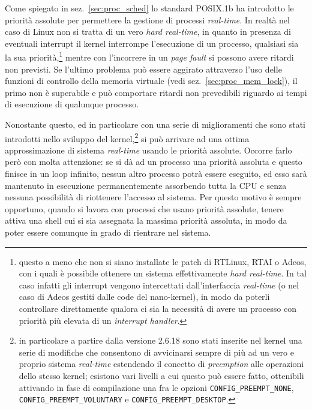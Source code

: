 Come spiegato in sez.~\ref{sec:proc_sched} lo standard POSIX.1b ha introdotto
le priorità assolute per permettere la gestione di processi
\textit{real-time}. In realtà nel caso di Linux non si tratta di un vero
\textit{hard real-time}, in quanto in presenza di eventuali interrupt il
kernel interrompe l'esecuzione di un processo, qualsiasi sia la sua
priorità,\footnote{questo a meno che non si siano installate le patch di
  RTLinux, RTAI o Adeos, con i quali è possibile ottenere un sistema
  effettivamente \textit{hard real-time}. In tal caso infatti gli interrupt
  vengono intercettati dall'interfaccia \textit{real-time} (o nel caso di
  Adeos gestiti dalle code del nano-kernel), in modo da poterli controllare
  direttamente qualora ci sia la necessità di avere un processo con priorità
  più elevata di un \textit{interrupt handler}.} mentre con l'incorrere in un
\textit{page fault} si possono avere ritardi non previsti.  Se l'ultimo
problema può essere aggirato attraverso l'uso delle funzioni di controllo
della memoria virtuale (vedi sez.~\ref{sec:proc_mem_lock}), il primo non è
superabile e può comportare ritardi non prevedibili riguardo ai tempi di
esecuzione di qualunque processo.

Nonostante questo, ed in particolare con una serie di miglioramenti che sono
stati introdotti nello sviluppo del kernel,\footnote{in particolare a partire
  dalla versione 2.6.18 sono stati inserite nel kernel una serie di modifiche
  che consentono di avvicinarsi sempre di più ad un vero e proprio sistema
  \textit{real-time} estendendo il concetto di \textit{preemption} alle
  operazioni dello stesso kernel; esistono vari livelli a cui questo può
  essere fatto, ottenibili attivando in fase di compilazione una fra le
  opzioni \texttt{CONFIG\_PREEMPT\_NONE}, \texttt{CONFIG\_PREEMPT\_VOLUNTARY}
  e \texttt{CONFIG\_PREEMPT\_DESKTOP}.} si può arrivare ad una ottima
approssimazione di sistema \textit{real-time} usando le priorità assolute.
Occorre farlo però con molta attenzione: se si dà ad un processo una priorità
assoluta e questo finisce in un loop infinito, nessun altro processo potrà
essere eseguito, ed esso sarà mantenuto in esecuzione permanentemente
assorbendo tutta la CPU e senza nessuna possibilità di riottenere l'accesso al
sistema. Per questo motivo è sempre opportuno, quando si lavora con processi
che usano priorità assolute, tenere attiva una shell cui si sia assegnata la
massima priorità assoluta, in modo da poter essere comunque in grado di
rientrare nel sistema.

